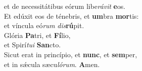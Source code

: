 \oddverse et de necessitátibus eórum libe\textit{rá}\textit{vit} \textbf{e}os.\\
\evenverse Et edúxit eos de ténebris, et \textbf{um}bra \textbf{mor}tis:~\*\\
\evenverse et víncula eó\textit{rum} \textit{dis}\textbf{rú}pit.\\
\oddverse Glória \textbf{Pa}tri, et \textbf{Fí}lio,~\*\\
\oddverse et Spirí\textit{tu}\textit{i} \textbf{San}cto.\\
\evenverse Sicut erat in princípio, et \textbf{nunc}, et \textbf{sem}per,~\*\\
\evenverse et in sǽcula sæcu\textit{ló}\textit{rum}. \textbf{A}men.\\
